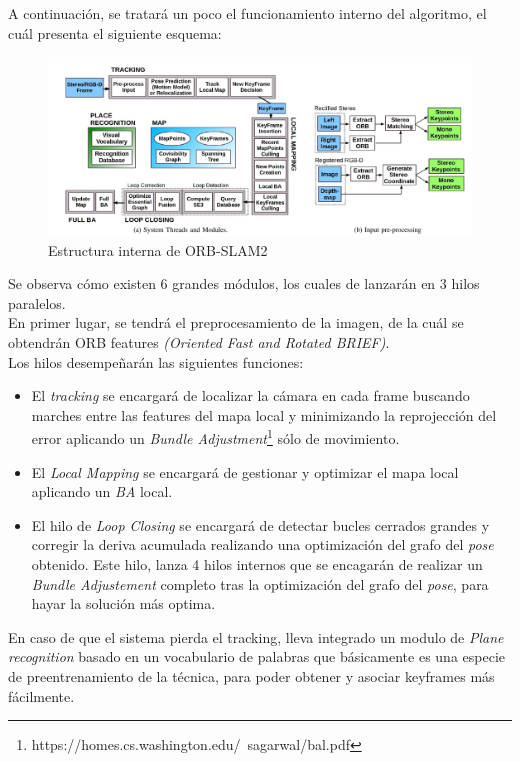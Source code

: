 A continuación, se tratará un poco el funcionamiento interno del algoritmo, el cuál presenta el siguiente esquema:
\begin{figure}[h!]
    \centering
    \includegraphics[width=1\textwidth]{images/orb_scheme}
    \caption{Estructura interna de ORB-SLAM2}
\end{figure}

Se observa cómo existen 6 grandes módulos, los cuales de lanzarán en 3 hilos paralelos. \\
En primer lugar, se tendrá el preprocesamiento de la imagen, de la cuál se obtendrán  ORB features 
\textit{(Oriented Fast and Rotated BRIEF)}. \\
Los hilos desempeñarán las siguientes funciones:
\begin{itemize}
    \item El \textit{tracking} se encargará de localizar la cámara en cada frame buscando marches entre las features
    del mapa local y minimizando la reprojección del error aplicando un \textit{Bundle Adjustment}\footnote{https://homes.cs.washington.edu/~sagarwal/bal.pdf} sólo de 
    movimiento.
    \item El \textit{Local Mapping} se encargará de gestionar y optimizar el mapa local aplicando un \textit{BA} local.
    \item El hilo de \textit{Loop Closing} se encargará de detectar bucles cerrados grandes y corregir la deriva acumulada
    realizando una optimización del grafo del \textit{pose} obtenido. Este hilo, lanza 4 hilos internos que se encagarán de
    realizar un \textit{Bundle Adjustement} completo tras la optimización del grafo del \textit{pose}, para hayar la solución
    más optima.
\end{itemize}

En caso de que el sistema pierda el tracking, lleva integrado un modulo de \textit{Plane recognition} basado en un vocabulario 
de palabras que básicamente es una especie de preentrenamiento de la técnica, para poder obtener y asociar keyframes más fácilmente. \\

